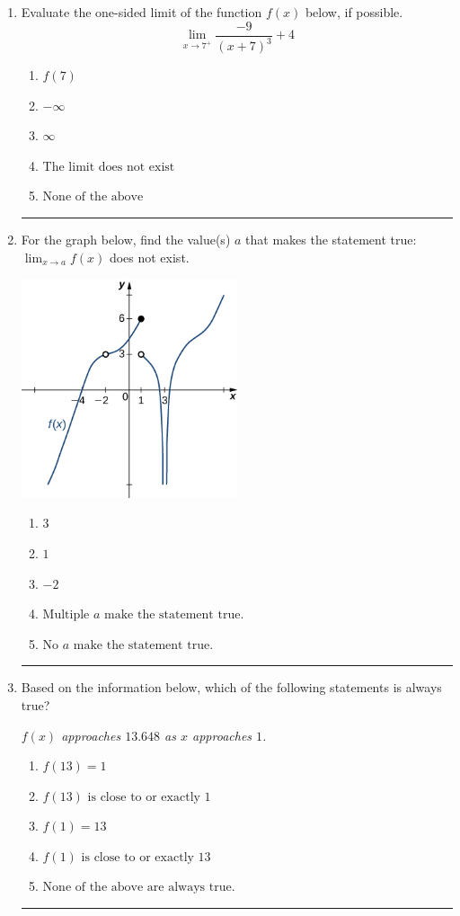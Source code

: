 \documentclass[14pt]{extbook}
\newcommand{\litem}[1]{\item#1\hspace*{-1cm}\rule{\textwidth}{0.4pt}}
\begin{document}
\begin{enumerate}
{\begin{enumerate}[label=\Alph*.]
\end{enumerate} }
\litem{
Evaluate the one-sided limit of the function $f(x)$ below, if possible.\[ \lim_{x \rightarrow 7^+} \frac{-9}{(x+7)^3}+4 \]\begin{enumerate}[label=\Alph*.]
\item \( f(7) \)
\item \( -\infty \)
\item \( \infty \)
\item \( \text{The limit does not exist} \)
\item \( \text{None of the above} \)

\end{enumerate} }
\litem{
For the graph below, find the value(s) $a$ that makes the statement true: $ \displaystyle \lim_{x \rightarrow a} f(x)$ does not exist.
\begin{center}
    \includegraphics[width=0.5\textwidth]{../Figures/evaluateLimitGraphicallyCopyA.png}
\end{center}
\begin{enumerate}[label=\Alph*.]
\item \( 3 \)
\item \( 1 \)
\item \( -2 \)
\item \( \text{Multiple } a \text{ make the statement true}. \)
\item \( \text{No } a \text{ make the statement true}. \)

\end{enumerate} }
\litem{
Based on the information below, which of the following statements is always true?
\begin{center}
    \textit{ $f(x)$ approaches $13.648$ as $x$ approaches $1$. }
\end{center}
\begin{enumerate}[label=\Alph*.]
\item \( f(13) = 1 \)
\item \( f(13) \text{ is close to or exactly } 1 \)
\item \( f(1) = 13 \)
\item \( f(1) \text{ is close to or exactly } 13 \)
\item \( \text{None of the above are always true.} \)


\end{enumerate}}
\end{enumerate}
\end{document}
